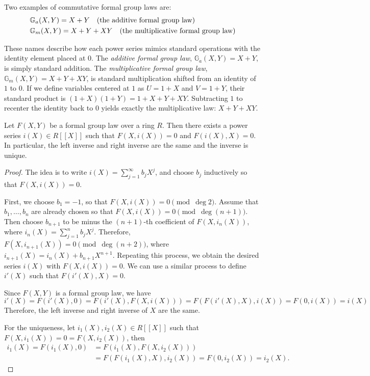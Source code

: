 \begin{example}
    Two examples of commutative formal group laws are:
    \begin{align*}
        & \mathbb{G}_a (X,Y) = X + Y \quad \text{(the additive formal group law)} \\
        & \mathbb{G}_m (X,Y) = X + Y + XY \quad \text{(the multiplicative formal group law)}
    \end{align*}

    These names describe how each power series mimics standard operations with the identity
    element placed at $0$. The \emph{additive formal group law},
    $\mathbb{G}_a(X,Y) = X + Y$, is simply standard addition.
    The \emph{multiplicative formal group law}, $\mathbb{G}_m(X,Y) = X + Y + XY$,
    is standard multiplication shifted from an identity of $1$ to $0$. If we define
    variables centered at $1$ as $U = 1+X$ and $V = 1+Y$, their standard product is
    $(1+X)(1+Y) = 1 + X + Y + XY$. Subtracting $1$ to recenter the identity back to $0$
    yields exactly the multiplicative law: $X + Y + XY$.
\end{example}

\begin{lemma}
    Let $F(X, Y)$ be a formal group law over a ring $R$. Then there exists a power series
    $i(X) \in R [\![X]\!]$ such that $F(X, i(X)) = 0$ and $F(i(X),X) = 0$.
    In particular, the left inverse and right inverse are the same and the inverse is unique.
    \label{lem: additive inverse}
\end{lemma}

\begin{proof}
    The idea is to write $i(X) = \sum_{j= 1}^\infty b_j X ^ j$, and choose $b_j$ inductively so that
    $F(X,i(X)) = 0$. \par
    First, we choose $b_1 = -1$, so that $F(X, i(X)) = 0 \pmod{\deg 2}$. Assume that
    $b_1, \ldots, b_n$ are already chosen so that $F(X, i(X)) = 0 \pmod{\deg (n + 1)}$.
    Then choose $b_{n+1}$ to be minus the $(n+1)$-th coefficient of $F(X, i_n(X))$, where
    $i_n(X)= \sum_{j = 1}^n b_j X ^ j$. Therefore, $F(X, i_{n+1}(X)) = 0 \pmod{\deg (n + 2)}$,
    where $i_{n+1}(X) = i_n(X) + b_{n+1}X ^{n+1}$. Repeating this process, we obtain the desired
    series $i(X)$ with $F(X,i(X)) = 0$. We can use a similar process to define $i'(X)$ such that
    $F(i'(X), X) = 0$. \par
    Since $F(X,Y)$ is a formal group law, we have
    \[ i'(X) = F(i'(X), 0) = F(i'(X), F(X, i(X))) = F(F(i'(X), X), i(X)) =
    F(0,i(X)) = i(X)
    \]
    Therefore, the left inverse and right inverse of $X$ are the same.

    For the uniqueness, let $i_1(X), i_2(X) \in R[\![X]\!]$ such that
    $F(X,i_1(X)) = 0 = F(X, i_2(X))$, then
    \begin{align*}
        i_1(X) = F(i_1(X), 0) &= F(i_1(X), F(X, i_2(X))) \\
        &= F(F(i_1(X), X), i_2(X)) = F(0, i_2(X)) = i_2(X).
    \end{align*}

\end{proof}

